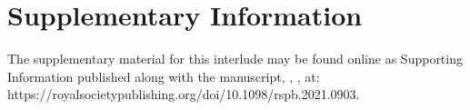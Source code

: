 \begin{interludeenv}
	{ \begin{center}  \end{center} }

\end{interludeenv}
\endgroup


\begingroup

\let\clearpage\relax
\let\cleardoublepage\relax
\let\cleardoublepage\relax

{\chapter*{Supplementary Information}}

The supplementary material for this interlude may be found online as Supporting Information published along with the manuscript, \textcite{netz2022}, , at:
https://royalsocietypublishing.org/doi/10.1098/rspb.2021.0903.


{ \begin{center}  \end{center} }

\endgroup

\afterpage{\nopagecolor}
\pagestyle{scrheadings}
